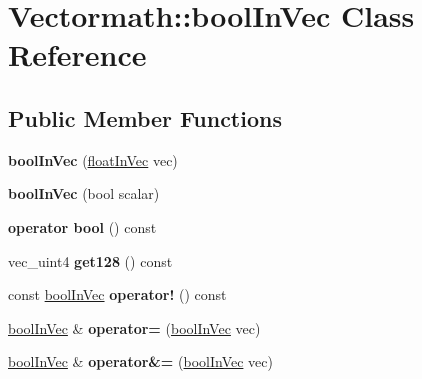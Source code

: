 \hypertarget{classVectormath_1_1boolInVec}{\section{Vectormath\-:\-:bool\-In\-Vec Class Reference}
\label{classVectormath_1_1boolInVec}
}
\subsection*{Public Member Functions}
\begin{DoxyCompactItemize}
\item 
\hypertarget{classVectormath_1_1boolInVec_aa21ebe5fd4b82622482071def03bf027}{{\bfseries bool\-In\-Vec} (\hyperlink{classVectormath_1_1floatInVec}{float\-In\-Vec} vec)}\label{classVectormath_1_1boolInVec_aa21ebe5fd4b82622482071def03bf027}

\item 
\hypertarget{classVectormath_1_1boolInVec_a4f28ddfcc232b287446eb659b2c5f326}{{\bfseries bool\-In\-Vec} (bool scalar)}\label{classVectormath_1_1boolInVec_a4f28ddfcc232b287446eb659b2c5f326}

\item 
\hypertarget{classVectormath_1_1boolInVec_a258f20bcd56f284843a5e4a0964af02a}{{\bfseries operator bool} () const }\label{classVectormath_1_1boolInVec_a258f20bcd56f284843a5e4a0964af02a}

\item 
\hypertarget{classVectormath_1_1boolInVec_a3523ca46403bfc89cc8f866a377bd26a}{vec\-\_\-uint4 {\bfseries get128} () const }\label{classVectormath_1_1boolInVec_a3523ca46403bfc89cc8f866a377bd26a}

\item 
\hypertarget{classVectormath_1_1boolInVec_aba21c8c76cb386b1d6b2c38cdabd2336}{const \hyperlink{classVectormath_1_1boolInVec}{bool\-In\-Vec} {\bfseries operator!} () const }\label{classVectormath_1_1boolInVec_aba21c8c76cb386b1d6b2c38cdabd2336}

\item 
\hypertarget{classVectormath_1_1boolInVec_a2c50cda65cc64eb8a72ccab7fc4ad88d}{\hyperlink{classVectormath_1_1boolInVec}{bool\-In\-Vec} \& {\bfseries operator=} (\hyperlink{classVectormath_1_1boolInVec}{bool\-In\-Vec} vec)}\label{classVectormath_1_1boolInVec_a2c50cda65cc64eb8a72ccab7fc4ad88d}

\item 
\hypertarget{classVectormath_1_1boolInVec_a2a14f17fa25b360c5984c491d121f446}{\hyperlink{classVectormath_1_1boolInVec}{bool\-In\-Vec} \& {\bfseries operator\&=} (\hyperlink{classVectormath_1_1boolInVec}{bool\-In\-Vec} vec)}\label{classVectormath_1_1boolInVec_a2a14f17fa25b360c5984c491d121f446}


\end{DoxyCompactItemize}

